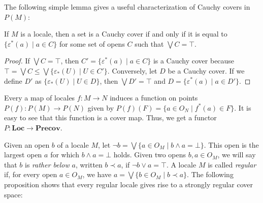 \documentclass[reqno]{amsart}
\theoremstyle{definition}
\theoremstyle{remark}
\numberwithin{figure}{section}
\newcommand{\rb}{\prec}
\newcommand{\cat}[1]{\mathbf{#1}}
\begin{document}
The following simple lemma gives a useful characterization of Cauchy covers in $P(M)$:

\begin{lem}
If $M$ is a locale, then a set is a Cauchy cover if and only if it is equal to $\{ \varepsilon^*(a) \mid a \in C \}$ for some set of opens $C$ such that $\bigvee C = \top$.
\end{lem}
\begin{proof}
If $\bigvee C = \top$, then $C' = \{ \varepsilon^*(a) \mid a \in C \}$ is a Cauchy cover because $\top = \bigvee C \leq \bigvee \{ \varepsilon_*(U) \mid U \in C' \}$.
Conversely, let $D$ be a Cauchy cover.
If we define $D'$ as $\{ \varepsilon_*(U) \mid U \in D \}$, then $\bigvee D' = \top$ and $D = \{ \varepsilon^*(a) \mid a \in D' \}$.
\end{proof}

Every a map of locales $f : M \to N$ induces a function on points $P(f) : P(M) \to P(N)$ given by $P(f)(F) = \{ a \in O_N \mid f^*(a) \in F \}$.
It is easy to see that this function is a cover map.
Thus, we get a functor $P : \cat{Loc} \to \cat{Precov}$.

Given an open $b$ of a locale $M$, let $\neg b = \bigvee \{ a \in O_M \mid b \wedge a = \bot \}$.
This open is the largest open $a$ for which $b \wedge a = \bot$ holds.
Given two opens $b,a \in O_M$, we will say that $b$ is \emph{rather below} $a$, written $b \rb a$, if $\neg b \vee a = \top$.
A locale $M$ is called \emph{regular} if, for every open $a \in O_M$, we have $a = \bigvee \{ b \in O_M \mid b \rb a \}$.
The following proposition shows that every regular locale gives rise to a strongly regular cover space:
\end{document}
